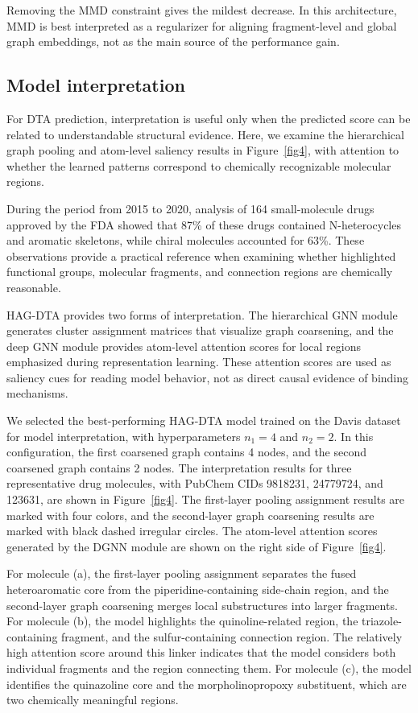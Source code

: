 \documentclass[pdflatex,sn-mathphys-num]{sn-jnl}%
\theoremstyle{thmstyleone}%
\theoremstyle{thmstyletwo}%
\theoremstyle{thmstylethree}%
\begin{document}
Removing the MMD constraint gives the mildest decrease. In this architecture, MMD is best interpreted as a regularizer for aligning fragment-level and global graph embeddings, not as the main source of the performance gain. 

\subsection{Model interpretation}

For DTA prediction, interpretation is useful only when the predicted score can be related to understandable structural evidence. Here, we examine the hierarchical graph pooling and atom-level saliency results in Figure~\ref{fig4}, with attention to whether the learned patterns correspond to chemically recognizable molecular regions.

During the period from 2015 to 2020, analysis of 164 small-molecule drugs approved by the FDA showed that 87\% of these drugs contained N-heterocycles and aromatic skeletons, while chiral molecules accounted for 63\%\cite{bhutani2021us}. These observations provide a practical reference when examining whether highlighted functional groups, molecular fragments, and connection regions are chemically reasonable.

HAG-DTA provides two forms of interpretation. The hierarchical GNN module generates cluster assignment matrices that visualize graph coarsening, and the deep GNN module provides atom-level attention scores for local regions emphasized during representation learning. These attention scores are used as saliency cues for reading model behavior, not as direct causal evidence of binding mechanisms.

We selected the best-performing HAG-DTA model trained on the Davis dataset for model interpretation, with hyperparameters $n_1=4$ and $n_2=2$. In this configuration, the first coarsened graph contains 4 nodes, and the second coarsened graph contains 2 nodes. The interpretation results for three representative drug molecules, with PubChem CIDs 9818231, 24779724, and 123631\cite{kim2016pubchem}, are shown in Figure~\ref{fig4}. The first-layer pooling assignment results are marked with four colors, and the second-layer graph coarsening results are marked with black dashed irregular circles. The atom-level attention scores generated by the DGNN module are shown on the right side of Figure~\ref{fig4}.

For molecule (a), the first-layer pooling assignment separates the fused heteroaromatic core from the piperidine-containing side-chain region, and the second-layer graph coarsening merges local substructures into larger fragments. For molecule (b), the model highlights the quinoline-related region, the triazole-containing fragment, and the sulfur-containing connection region. The relatively high attention score around this linker indicates that the model considers both individual fragments and the region connecting them. For molecule (c), the model identifies the quinazoline core and the morpholinopropoxy substituent, which are two chemically meaningful regions.
\end{document}
